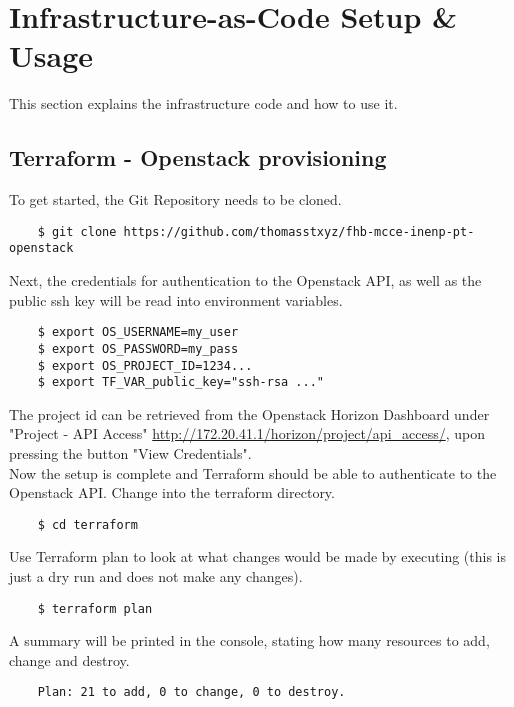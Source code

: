 \section{Infrastructure-as-Code Setup \& Usage}
This section explains the infrastructure code and how to use it.

\subsection{Terraform - Openstack provisioning}
To get started, the Git Repository needs to be cloned.

\begin{verbatim}
	$ git clone https://github.com/thomasstxyz/fhb-mcce-inenp-pt-openstack
\end{verbatim}

\noindent
Next, the credentials for authentication to the Openstack API,
as well as the public ssh key will be
read into environment variables.

\begin{verbatim}
	$ export OS_USERNAME=my_user
	$ export OS_PASSWORD=my_pass
	$ export OS_PROJECT_ID=1234...
	$ export TF_VAR_public_key="ssh-rsa ..."	
\end{verbatim}

\noindent
The project id can be retrieved from the Openstack Horizon Dashboard
under "Project - API Access" 
\url{http://172.20.41.1/horizon/project/api_access/},
upon pressing the button "View Credentials". \\

\noindent
Now the setup is complete and Terraform should be able to authenticate
to the Openstack API. Change into the terraform directory.

\begin{verbatim}
	$ cd terraform
\end{verbatim}

\noindent
Use Terraform plan to look at what changes would be made by executing
(this is just a dry run and does not make any changes).

\begin{verbatim}
	$ terraform plan
\end{verbatim}

\noindent
A summary will be printed in the console, stating 
how many resources to add, change and destroy. \\

\begin{verbatim}
	Plan: 21 to add, 0 to change, 0 to destroy.
\end{verbatim}

